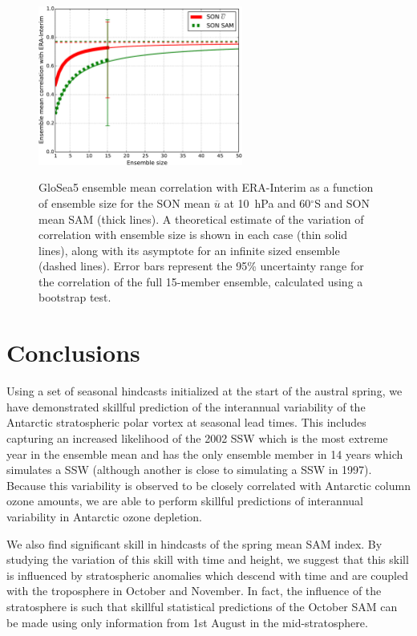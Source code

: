 \begin{figure}[t]
  \centering
  \noindent\includegraphics[width=0.6\textwidth,angle=0]{figures/chapter-seasonal/corr_ens_size_crop.pdf}\\
  \caption[Variation of GloSea5 forecast skill with ensemble size]{GloSea5
    ensemble mean correlation with ERA-Interim as a function of ensemble size
    for the SON mean $\overline{u}$ at 10~hPa and 60$^{\circ}$S and SON mean SAM
    (thick lines). A theoretical estimate of the variation of correlation with
    ensemble size is shown in each case (thin solid lines), along with its
    asymptote for an infinite sized ensemble (dashed lines). Error bars
    represent the 95\% uncertainty range for the correlation of the full
    15-member ensemble, calculated using a bootstrap
    test.}\label{fig:corr_ens_size_sh}
\end{figure}


\section{Conclusions}
\label{sec:seas-conclusions}
Using a set of seasonal hindcasts initialized at the start of the austral
spring, we have demonstrated skillful prediction of the interannual variability
of the Antarctic stratospheric polar vortex at seasonal lead times. This
includes capturing an increased likelihood of the 2002 SSW which is the most
extreme year in the ensemble mean and has the only ensemble member in 14 years
which simulates a SSW (although another is close to simulating a SSW in
1997). Because this variability is observed to be closely correlated with
Antarctic column ozone amounts, we are able to perform skillful predictions of
interannual variability in Antarctic ozone depletion.

We also find significant skill in hindcasts of the spring mean SAM index.  By
studying the variation of this skill with time and height, we suggest that this
skill is influenced by stratospheric anomalies which descend with time and are
coupled with the troposphere in October and November. In fact, the influence of
the stratosphere is such that skillful statistical predictions of the October
SAM can be made using only information from 1st August in the mid-stratosphere.

